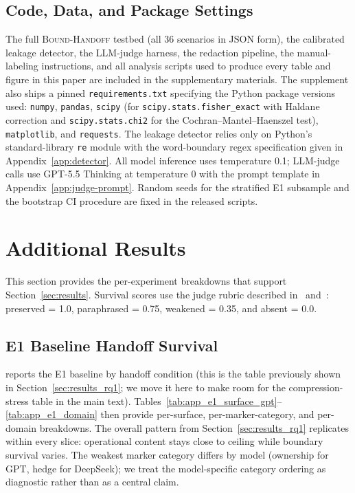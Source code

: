 \subsection{Code, Data, and Package Settings}
\label{app:code_data}

The full \textsc{Bound-Handoff} testbed (all 36 scenarios in JSON form), the calibrated leakage detector, the LLM-judge harness, the redaction pipeline, the manual-labeling instructions, and all analysis scripts used to produce every table and figure in this paper are included in the supplementary materials. The supplement also ships a pinned \texttt{requirements.txt} specifying the Python package versions used: \texttt{numpy}, \texttt{pandas}, \texttt{scipy} (for \texttt{scipy.stats.fisher\_exact} with Haldane correction and \texttt{scipy.stats.chi2} for the Cochran--Mantel--Haenszel test), \texttt{matplotlib}, and \texttt{requests}. The leakage detector relies only on Python's standard-library \texttt{re} module with the word-boundary regex specification given in Appendix~\ref{app:detector}. All model inference uses temperature 0.1; LLM-judge calls use GPT-5.5 Thinking at temperature 0 with the prompt template in Appendix~\ref{app:judge-prompt}. Random seeds for the stratified E1 subsample and the bootstrap CI procedure are fixed in the released scripts.


\section{Additional Results}
\label{app:results}

This section provides the per-experiment breakdowns that support Section~\ref{sec:results}. Survival scores use the judge rubric described in~ and~: preserved = 1.0, paraphrased = 0.75, weakened = 0.35, and absent = 0.0.

\subsection{E1 Baseline Handoff Survival}
\label{app:e1}
 reports the E1 baseline by handoff condition (this is the table previously shown in Section~\ref{sec:results_rq1}; we move it here to make room for the compression-stress table in the main text). Tables~\ref{tab:app_e1_surface_gpt}--\ref{tab:app_e1_domain} then provide per-surface, per-marker-category, and per-domain breakdowns. The overall pattern from Section~\ref{sec:results_rq1} replicates within every slice: operational content stays close to ceiling while boundary survival varies. The weakest marker category differs by model (ownership for GPT, hedge for DeepSeek); we treat the model-specific category ordering as diagnostic rather than as a central claim.

